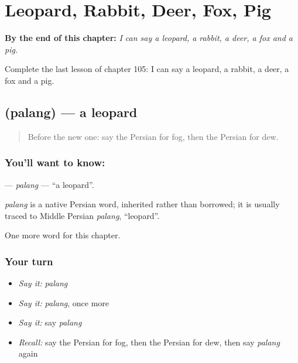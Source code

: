 
\chapter{Leopard, Rabbit, Deer, Fox, Pig}
\label{ch:fa-leopard-rabbit-deer-fox-pig}

\begin{chapteropening}
\textbf{By the end of this chapter:} \emph{I can say a leopard, a rabbit, a deer, a fox and a pig.}

Complete the last lesson of chapter 105: I can say a leopard, a rabbit, a deer, a fox and a pig.
\end{chapteropening}

\section[\texorpdfstring{\fa{پلنگ} (palang)}{پلنگ (palang)}]{ (palang) — a leopard}

\label{lesson:FA-C105-palang}



\begin{quote}
Before the new one: say the Persian for fog, then the Persian for dew.
\end{quote}

\subsection*{You'll want to know: }
\textbf{} — \emph{palang} — \textquotedblleft{}a leopard\textquotedblright{}.

\begin{cousinweb}
\emph{palang} is a native Persian word, inherited rather than borrowed; it is usually traced to Middle Persian \emph{palang}, \textquotedblleft{}leopard\textquotedblright{}.
\end{cousinweb}

\begin{grammarlens}[title={What you've built}]
One more word for this chapter.
\end{grammarlens}

\subsection*{Your turn}
\begin{itemize}
\raggedright
  \item \emph{Say it:} \emph{palang}
  \item \emph{Say it:} \emph{palang}, once more
  \item \emph{Say it:} say \emph{palang}
  \item \emph{Recall:} say the Persian for fog, then the Persian for dew, then say \emph{palang} again
\end{itemize}

